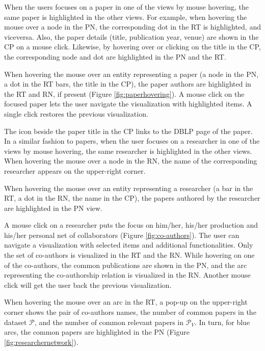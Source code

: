 When the users focuses on a paper in one of the views by mouse hovering, the same paper is highlighted in the other views. For example, when hovering the mouse over a node in the PN, the corresponding dot in the RT is highlighted, and viceversa. Also, the paper details (title, publication year, venue) are shown in the CP on a mouse click. Likewise, by hovering over or clicking on the title in the CP, the corresponding node and dot are highlighted in the PN and the RT.
       
When hovering the mouse over an entity representing a paper (a node in the PN, a dot in the RT bars, the title in the CP), the paper authors are highlighted in the RT and RN, if present (Figure \ref{fig:paperhovering}). A mouse click on the focused paper lets the user navigate the visualization with highlighted items. A single click restores the previous visualization.

The icon beside the paper title in the CP links to the DBLP page of the paper. \\

 In a similar fashion to papers, when the user focuses on a researcher in one of the views by mouse hovering, the same researcher is highlighted in the other views. When hovering the mouse over a node in the RN, the name of the corresponding researcher appears on the upper-right corner.  

When hovering the mouse over an entity representing a researcher (a bar in the RT, a dot in the RN, the name in the CP), the papers authored by the researcher are highlighted in the PN view. 

A mouse click on a researcher puts the focus on him/her, his/her production and his/her personal net of collaborators (Figure \ref{fig:co-authors}). The user can navigate a visualization with selected items and additional functionalities. Only the set of co-authors is visualized in the RT and the RN. While hovering on one of the co-authors, the common publications are shown in the PN, and the arc representing the co-authorship relation is visualized in the RN. Another mouse click will get the user back the previous visualization.

When hovering the mouse over an arc in the RT, a pop-up on the upper-right corner shows the pair of co-authors names, the number of common papers in the dataset $\mathcal{P}$, and the number of common relevant papers in $\mathcal{P}_{V}$. In turn, for blue arcs, the common papers are highlighted in the PN (Figure \ref{fig:researchernetwork}). 


